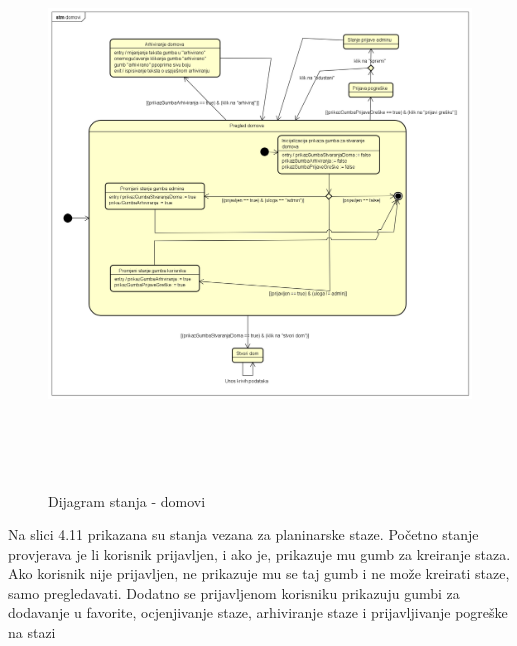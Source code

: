 			\begin{figure}[H]
				\includegraphics[width=160mm,height=150mm]{dijagrami/sd-autentikacija/domovi.png} %
				\centering
				\caption{Dijagram stanja - domovi}
				\label{fig:dijagrami_stanja2}
			\end{figure}
		
		    Na slici 4.11 prikazana su stanja vezana za planinarske staze. Početno stanje provjerava je li korisnik prijavljen, i ako je, prikazuje mu gumb za kreiranje staza. Ako korisnik nije prijavljen, ne prikazuje mu se taj gumb i ne može kreirati staze, samo pregledavati. Dodatno se prijavljenom korisniku prikazuju gumbi za dodavanje u favorite, ocjenjivanje staze, arhiviranje staze i prijavljivanje pogreške na stazi
		    
